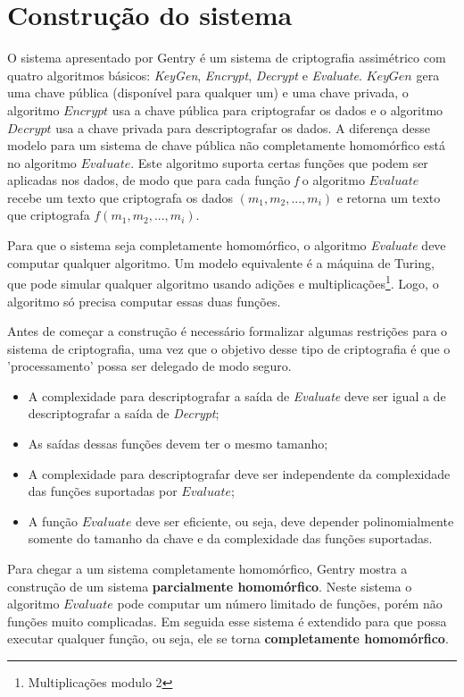 \section{Construção do sistema}
\label{construcao}
O sistema apresentado por Gentry é um sistema de criptografia assimétrico com quatro algoritmos básicos: \textit{KeyGen}, \textit{Encrypt}, \textit{Decrypt} e \textit{Evaluate}. $KeyGen$ gera uma chave pública (disponível para qualquer um) e uma chave privada, o algoritmo $Encrypt$ usa a chave pública para criptografar os dados e o algoritmo $Decrypt$ usa a chave privada para descriptografar os dados. A diferença desse modelo para um sistema de chave pública não completamente homomórfico está no algoritmo $Evaluate$. Este algoritmo suporta certas funções que podem ser aplicadas nos dados, de modo que para cada função \textit{f} o algoritmo $Evaluate$ recebe um texto que criptografa os dados $(m_1, m_2, ..., m_i)$ e retorna um texto que criptografa $f(m_1, m_2, ..., m_i)$.

Para que o sistema seja completamente homomórfico, o algoritmo \textit{Evaluate} deve computar qualquer algoritmo. Um modelo equivalente é a máquina de Turing, que pode simular qualquer algoritmo usando adições e multiplicações\footnote{Multiplicações modulo 2}. Logo, o algoritmo só precisa computar essas duas funções.

Antes de começar a construção é necessário formalizar algumas restrições para o sistema de criptografia, uma vez que o objetivo desse tipo de criptografia é que o 'processamento' possa ser delegado de modo seguro.
\begin{itemize}
	\item A complexidade para descriptografar a saída de \textit{Evaluate} deve ser igual a de descriptografar a saída de \textit{Decrypt};
	\item As saídas dessas funções devem ter o mesmo tamanho;
	\item A complexidade para descriptografar deve ser independente da complexidade das funções suportadas por $Evaluate$;
	\item A função $Evaluate$ deve ser eficiente, ou seja, deve depender polinomialmente somente do tamanho da chave e da complexidade das funções suportadas.
\end{itemize}

Para chegar a um sistema completamente homomórfico, Gentry mostra a construção de um sistema \textbf{parcialmente homomórfico}. Neste sistema o algoritmo $Evaluate$ pode computar um número limitado de funções, porém não funções muito complicadas. Em seguida esse sistema é extendido para que possa executar qualquer função, ou seja, ele se torna \textbf{completamente homomórfico}.


